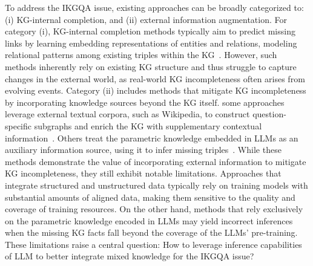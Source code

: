 To address the IKGQA issue, existing approaches can be broadly categorized to: (i) KG-internal completion, and (ii) external information augmentation. For category (i), KG-internal completion methods typically aim to predict missing links by learning embedding representations of entities and relations, modeling relational patterns among existing triples within the KG~\cite{saxena2022sequence, guo2023knowledge}. However, such methods inherently rely on existing KG structure and thus struggle to capture changes in the external world, as real-world KG incompleteness often arises from evolving events. Category (ii) includes methods that mitigate KG incompleteness by incorporating knowledge sources beyond the KG itself. some approaches leverage external textual corpora, such as Wikipedia, to construct question-specific subgraphs and enrich the KG with supplementary contextual information~\cite{sun2019pullnet, lv2020graph}. Others treat the parametric knowledge embedded in LLMs as an auxiliary information source, using it to infer missing triples~\cite{xu2024generate}. While these methods demonstrate the value of incorporating external information to mitigate KG incompleteness, they still exhibit notable limitations. Approaches that integrate structured and unstructured data typically rely on training models with substantial amounts of aligned data, making them sensitive to the quality and coverage of training resources. On the other hand, methods that rely exclusively on the parametric knowledge encoded in LLMs may yield incorrect inferences when the missing KG facts fall beyond the coverage of the LLMs' pre-training. These limitations raise a central question: How to leverage inference capabilities of LLM to better integrate mixed knowledge for the IKGQA issue?

